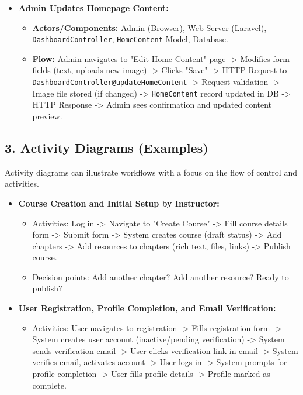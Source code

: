 \begin{itemize}
    \item \textbf{Admin Updates Homepage Content:}
    \begin{itemize}
        \item \textbf{Actors/Components:} Admin (Browser), Web Server (Laravel), \texttt{DashboardController}, \texttt{HomeContent} Model, Database.
        \item \textbf{Flow:} Admin navigates to "Edit Home Content" page -> Modifies form fields (text, uploads new image) -> Clicks "Save" -> HTTP Request to \texttt{DashboardController@updateHomeContent} -> Request validation -> Image file stored (if changed) -> \texttt{HomeContent} record updated in DB -> HTTP Response -> Admin sees confirmation and updated content preview.
    \end{itemize}
\end{itemize}

\subsection*{3. Activity Diagrams (Examples)}

Activity diagrams can illustrate workflows with a focus on the flow of control and activities.

\begin{itemize}
    \item \textbf{Course Creation and Initial Setup by Instructor:}
    \begin{itemize}
        \item Activities: Log in -> Navigate to "Create Course" -> Fill course details form -> Submit form -> System creates course (draft status) -> Add chapters -> Add resources to chapters (rich text, files, links) -> Publish course.
        \item Decision points: Add another chapter? Add another resource? Ready to publish?
    \end{itemize}
    \item \textbf{User Registration, Profile Completion, and Email Verification:}
    \begin{itemize}
        \item Activities: User navigates to registration -> Fills registration form -> System creates user account (inactive/pending verification) -> System sends verification email -> User clicks verification link in email -> System verifies email, activates account -> User logs in -> System prompts for profile completion -> User fills profile details -> Profile marked as complete.
    \end{itemize}
\end{itemize}

